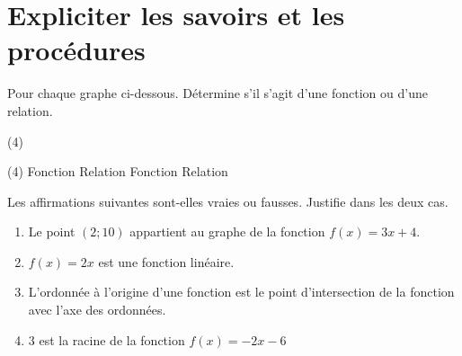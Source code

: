 \documentclass[a4paper, 12pt, parskip=half-]{scrartcl}
\begin{document}
\section*{ Expliciter les savoirs et les procédures}
\begin{exercise}[points=2]
    Pour chaque graphe ci-dessous. Détermine s'il s'agit d'une fonction ou d'une relation.
    \begin{tasks}(4)
        \task 
        \task 
        \task 
        \task 
    \end{tasks}
\end{exercise}
\begin{solution}
    \begin{tasks}(4)
        \task Fonction
        \task Relation
        \task Fonction
        \task Relation
    \end{tasks}
\end{solution}
\begin{exercise}[points=4]
    Les affirmations suivantes sont-elles vraies ou fausses. Justifie dans les deux cas.
    \begin{enumerate}
        \item Le point $(2;10)$ appartient au graphe de la fonction $f(x)=3x+4$.
        \item $f(x) = 2x$ est une fonction linéaire.
        \item L'ordonnée à l'origine d'une fonction est le point d'intersection de la fonction avec l'axe des ordonnées.
        \item $3$ est la racine de la fonction $f(x)=-2x-6$
    \end{enumerate}
\end{exercise}
\end{document}
